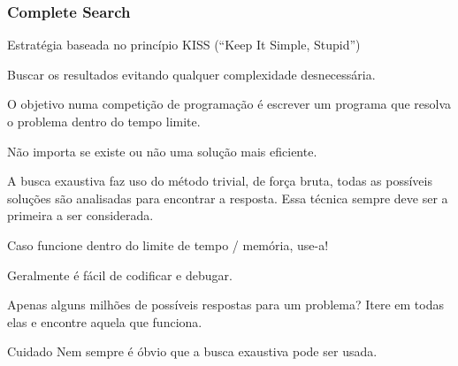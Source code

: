 \begin{frame}
\frametitle{Complete Search}
\begin{block}{}
\begin{itemize}
	\bitem Estratégia baseada no princípio KISS (``Keep It Simple, Stupid'')
	\begin{itemize}
		\bitem Buscar os resultados evitando qualquer complexidade desnecessária.
	\end{itemize}
	\bitem O objetivo numa competição de programação é escrever um programa que resolva o problema dentro do tempo limite.
	\begin{itemize}
		\bitem Não importa se existe ou não uma solução mais eficiente.
	\end{itemize}
	\bitem A busca exaustiva faz uso do método trivial, de força bruta, todas as possíveis soluções são analisadas para encontrar a resposta.
	\bitem Essa técnica sempre deve ser a primeira a ser considerada.
	\begin{itemize}
		\bitem Caso funcione dentro do limite de tempo / memória, use-a! 
		\begin{itemize}
			\bitem Geralmente é fácil de codificar e debugar.
		\end{itemize}
	\end{itemize}
	\bitem Apenas alguns milhões de possíveis respostas para um problema? Itere em todas elas e encontre aquela que funciona.
\end{itemize}
\end{block}
\pause

\begin{block}{\tiny Cuidado}
Nem sempre é óbvio que a busca exaustiva pode ser usada.
\end{block}
\end{frame}

